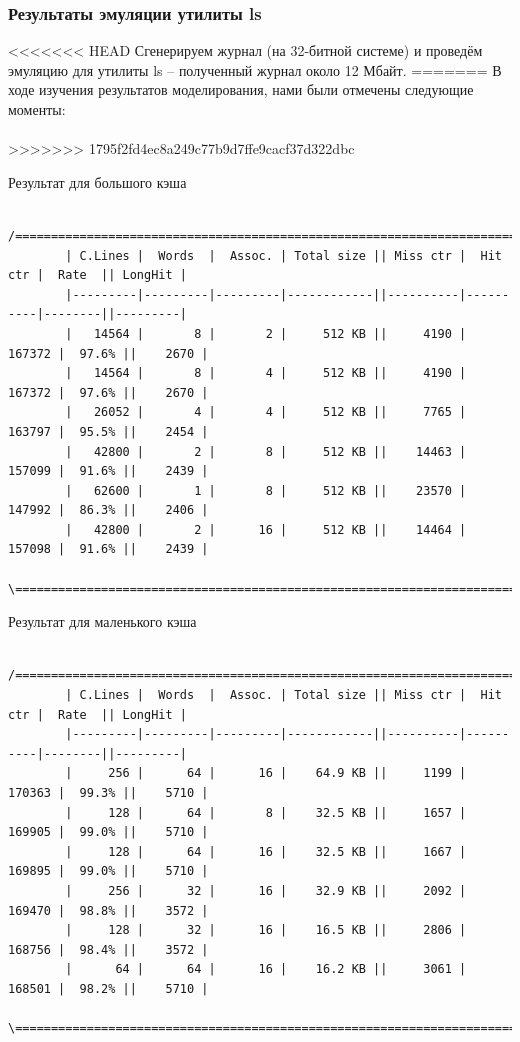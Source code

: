 \documentclass{beamer}
\begin{document}

\begin{frame}[fragile] %
\frametitle{Результаты эмуляции утилиты ls}

<<<<<<< HEAD
Сгенерируем журнал (на 32-битной системе) и проведём эмуляцию для утилиты ls -- полученный журнал около 12 Мбайт.
=======
В ходе изучения результатов моделирования, нами были отмечены
следующие моменты:\\~\\
>>>>>>> 1795f2fd4ec8a249c77b9d7ffe9cacf37d322dbc

\begin{block}{Результат для большого кэша}
\begin{verbatim}
        /=====================================================================================\
        | C.Lines |  Words  |  Assoc. | Total size || Miss ctr |  Hit ctr |  Rate  || LongHit |
        |---------|---------|---------|------------||----------|----------|--------||---------|
        |   14564 |       8 |       2 |     512 KB ||     4190 |   167372 |  97.6% ||    2670 |
        |   14564 |       8 |       4 |     512 KB ||     4190 |   167372 |  97.6% ||    2670 |
        |   26052 |       4 |       4 |     512 KB ||     7765 |   163797 |  95.5% ||    2454 |
        |   42800 |       2 |       8 |     512 KB ||    14463 |   157099 |  91.6% ||    2439 |
        |   62600 |       1 |       8 |     512 KB ||    23570 |   147992 |  86.3% ||    2406 |
        |   42800 |       2 |      16 |     512 KB ||    14464 |   157098 |  91.6% ||    2439 |
        \=====================================================================================/
\end{verbatim}
\end{block}

\begin{block}{Результат для маленького кэша}
\begin{verbatim}
        /=====================================================================================\
        | C.Lines |  Words  |  Assoc. | Total size || Miss ctr |  Hit ctr |  Rate  || LongHit |
        |---------|---------|---------|------------||----------|----------|--------||---------|
        |     256 |      64 |      16 |    64.9 KB ||     1199 |   170363 |  99.3% ||    5710 |
        |     128 |      64 |       8 |    32.5 KB ||     1657 |   169905 |  99.0% ||    5710 |
        |     128 |      64 |      16 |    32.5 KB ||     1667 |   169895 |  99.0% ||    5710 |
        |     256 |      32 |      16 |    32.9 KB ||     2092 |   169470 |  98.8% ||    3572 |
        |     128 |      32 |      16 |    16.5 KB ||     2806 |   168756 |  98.4% ||    3572 |
        |      64 |      64 |      16 |    16.2 KB ||     3061 |   168501 |  98.2% ||    5710 |
        \=====================================================================================/
\end{verbatim}
\end{block}

\end{frame}
\end{document}
